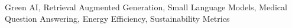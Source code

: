 \begin{keywords}
    Green AI, Retrieval Augmented Generation, Small Language Models, Medical Question Answering, Energy Efficiency, Sustainability Metrics
\end{keywords}
    